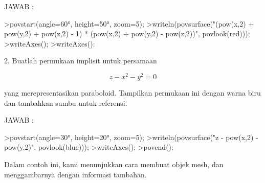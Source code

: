 \documentclass{article}
\begin{document}
\begin{eulernotebook}
\begin{eulercomment}
\begin{eulercomment}
\begin{eulercomment}
\begin{eulercomment}
\begin{eulercomment}
\begin{eulercomment}
\begin{eulercomment}
\begin{eulercomment}
\begin{eulercomment}
\begin{eulercomment}
\begin{eulercomment}
\begin{eulercomment}
\begin{eulercomment}
\begin{eulercomment}
\begin{eulercomment}
\begin{eulercomment}
\begin{eulercomment}
\begin{eulercomment}
\begin{eulercomment}
\begin{eulercomment}
\begin{eulercomment}
\begin{eulercomment}
\begin{eulercomment}
\begin{eulercomment}
\begin{eulercomment}
\begin{eulercomment}
\begin{eulercomment}
JAWAB :
\end{eulercomment}
\begin{eulerprompt}
>povstart(angle=60°, height=50°, zoom=5);
>writeln(povsurface("(pow(x,2) + pow(y,2) + pow(z,2) - 1) * (pow(x,2) + pow(y,2) - pow(z,2))", povlook(red)));
>writeAxes(); 
>writeAxes():
\end{eulerprompt}
\begin{eulercomment}
2. Buatlah permukaan implisit untuk persamaan\\
\end{eulercomment}
\begin{eulerformula}
\[
z-x^2-y^2=0 
\]
\end{eulerformula}
\begin{eulercomment}
yang merepresentasikan paraboloid. Tampilkan permukaan ini dengan
warna biru dan tambahkan sumbu untuk referensi.

JAWAB :
\end{eulercomment}
\begin{eulerprompt}
>povstart(angle=30°, height=20°, zoom=5);
>writeln(povsurface("z - pow(x,2) - pow(y,2)", povlook(blue)));
>writeAxes();
>povend();
\end{eulerprompt}
\eulersubheading{}
\begin{eulercomment}
\begin{eulercomment}
\begin{eulercomment}
Dalam contoh ini, kami menunjukkan cara membuat objek mesh, dan
menggambarnya dengan informasi tambahan.


\end{eulercomment}
\end{eulercomment}
\end{eulercomment}
\end{eulercomment}
\end{eulercomment}
\end{eulercomment}
\end{eulercomment}
\end{eulercomment}
\end{eulercomment}
\end{eulercomment}
\end{eulercomment}
\end{eulercomment}
\end{eulercomment}
\end{eulercomment}
\end{eulercomment}
\end{eulercomment}
\end{eulercomment}
\end{eulercomment}
\end{eulercomment}
\end{eulercomment}
\end{eulercomment}
\end{eulercomment}
\end{eulercomment}
\end{eulercomment}
\end{eulercomment}
\end{eulercomment}
\end{eulercomment}
\end{eulercomment}
\end{eulercomment}
\end{eulernotebook}
\end{document}
